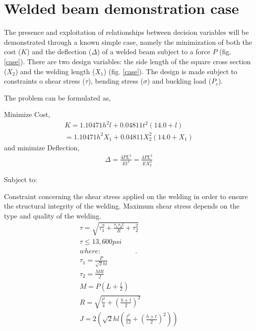 \section{Welded beam demonstration case}
The presence and exploitation of relationships between decision variables will be demonstrated through a known simple case, namely the minimization of both the cost ($K$) and the deflection ($\Delta$) of a welded beam subject to a force $P$ (fig. \ref{case}). There are two design variables: the side length of the square cross section ($X_2$) and the welding length ($X_1$) (fig. \ref{case}). The design is made subject to constraints o shear stress ($\tau$), bending stress ($\sigma$) and buckling load ($P_c$).   


The problem can be formulated as,

Minimize Cost,
\begin{eqnarray}\nonumber
   K = 1.10471h^2l+0.04811t^2(14.0+l) \\
   = 1.10471h^2X_1+0.04811X_2^2(14.0+X_1)
   \label{Cost} 
\end{eqnarray}
and minimize Deflection,
\begin{eqnarray}
   \Delta = \frac{4PL^3}{Et^4} = \frac{4PL^3}{EX_2^4}
   \label{Deflection} 
\end{eqnarray}

Subject to:


Constraint concerning the shear stress applied on the welding in order to ensure the structural integrity of the welding. Maximum shear stress depends on the type and quality of the welding. 
\begin{eqnarray}
   \tau = \sqrt{\tau_1^2 + \frac{\tau_1 \tau_2 l}{R} +\tau_2^2} \\
   \nonumber \tau \leq 13,600 psi \\
   \nonumber where:~~~~~~~~~~~~~~~~~~~~~~.\\
   \nonumber \tau_1 = \frac{P}{\sqrt{2}hl} \\
   \nonumber \tau_2 = \frac{MR}{J} \\   
   \nonumber M = P(L+\frac{l}{2}) \\ 
   \nonumber R = \sqrt{\frac{l^2}{4} + (\frac{h+t}{2})^2} \\
   \nonumber J = 2\left( \sqrt{2}hl\left( \frac{l^2}{12} + \left(\frac{h+t}{2}\right)^2 \right) \right)
   \label{shear} 
\end{eqnarray}

